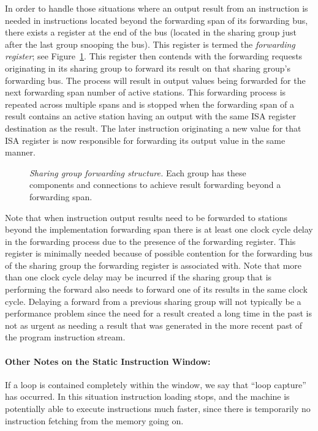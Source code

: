 \documentclass[10pt,dvips]{article}
\begin{document}
In order to handle
those situations where an output result from an instruction is
needed in instructions located beyond the forwarding span of its
forwarding bus, there exists a register at the end of the bus (located
in the sharing group just after the last group snooping the bus).  This register is
termed the {\it forwarding register}; see Figure~\ref{shareforward}.
This register then contends
with the forwarding requests originating in its sharing group to
forward its result on that sharing group's forwarding bus.  The process
will result in output values being forwarded for the next forwarding
span number of active stations.  This forwarding process is repeated
across multiple spans and is stopped
when the forwarding
span of a result contains an active station having an output with
the same ISA register destination as the result.
The later instruction originating a
new value for that ISA register is now responsible for forwarding its
output value in the same manner.

\begin{figure}
\centering
{}
\caption{{\em Sharing group forwarding structure.}
Each group has these components and connections to achieve
result forwarding beyond a forwarding span.}
\label{shareforward}
\end{figure}


Note that when instruction output results need to be forwarded to
stations beyond the implementation forwarding span there is at least
one clock cycle delay in the forwarding process due to the presence of
the forwarding register.  This register is minimally needed because of
possible contention for the forwarding bus of the sharing group the
forwarding register is associated with.  Note that more than one clock cycle
delay may
be incurred if the sharing group that is performing the forward also
needs to forward one of its results in the same clock cycle.  Delaying
a forward from a previous sharing group will not typically be a
performance problem since the need for a result created a long time in
the past is not as urgent as needing a result that was generated in the
more recent past of the program instruction stream.

\paragraph{Other Notes on the Static Instruction Window: }
If a loop is contained completely within the window, we say that
``loop capture'' has occurred. In this situation instruction
loading stops, and the machine is potentially able to execute
instructions much faster, since there is temporarily no instruction
fetching from the memory going on.
\end{document}
